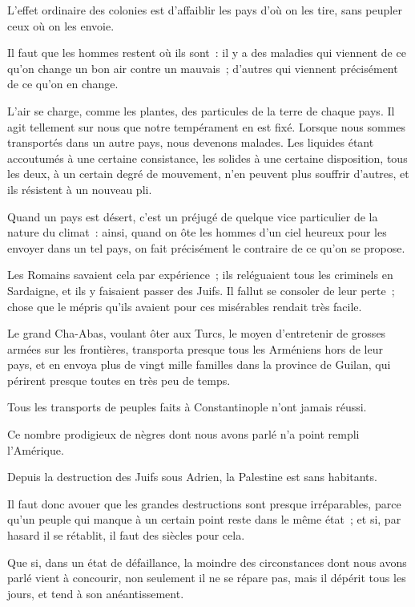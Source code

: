 \documentclass[french,twoside]{book} %
\begin{document}
\noindent L’effet ordinaire des colonies est d’affaiblir les pays d’où on les tire, sans peupler ceux où on les envoie.\par
Il faut que les hommes restent où ils sont : il y a des maladies qui viennent de ce qu’on change un bon air contre un mauvais ; d’autres qui viennent précisément de ce qu’on en change.\par
L’air se charge, comme les plantes, des particules de la terre de chaque pays. Il agit tellement sur nous que notre tempérament en est fixé. Lorsque nous sommes transportés dans un autre pays, nous devenons malades. Les liquides étant accoutumés à une certaine consistance, les solides à une certaine disposition, tous les deux, à un certain degré de mouvement, n’en peuvent plus souffrir d’autres, et ils résistent à un nouveau pli.\par
Quand un pays est désert, c’est un préjugé de quelque vice particulier de la nature du climat : ainsi, quand on ôte les hommes d’un ciel heureux pour les envoyer dans un tel pays, on fait précisément le contraire de ce qu’on se propose.\par
Les Romains savaient cela par expérience ; ils reléguaient tous les criminels en Sardaigne, et ils y faisaient passer des Juifs. Il fallut se consoler de leur perte ; chose que le mépris qu’ils avaient pour ces misérables rendait très facile.\par
Le grand Cha-Abas, voulant ôter aux Turcs, le moyen d’entretenir de grosses armées sur les frontières, transporta presque tous les Arméniens hors de leur pays, et en envoya plus de vingt mille familles dans la province de Guilan, qui périrent presque toutes en très peu de temps.\par
Tous les transports de peuples faits à Constantinople n’ont jamais réussi.\par
Ce nombre prodigieux de nègres dont nous avons parlé n’a point rempli l’Amérique.\par
Depuis la destruction des Juifs sous Adrien, la Palestine est sans habitants.\par
Il faut donc avouer que les grandes destructions sont presque irréparables, parce qu’un peuple qui manque à un certain point reste dans le même état ; et si, par hasard il se rétablit, il faut des siècles pour cela.\par
Que si, dans un état de défaillance, la moindre des circonstances dont nous avons parlé vient à concourir, non seulement il ne se répare pas, mais il dépérit tous les jours, et tend à son anéantissement.\par
\end{document}
